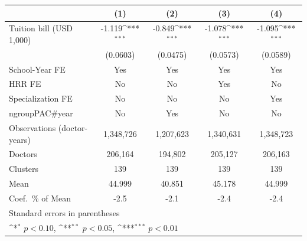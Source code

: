 {
\def\sym#1{\ifmmode^{#1}\else\(^{#1}\)\fi}
\begin{tabular}{l*{4}{c}}
\hline\hline
                    &\multicolumn{1}{c}{(1)}         &\multicolumn{1}{c}{(2)}         &\multicolumn{1}{c}{(3)}         &\multicolumn{1}{c}{(4)}         \\
\hline
Tuition bill (USD 1,000)&      -1.119\sym{***}&      -0.849\sym{***}&      -1.078\sym{***}&      -1.095\sym{***}\\
                    &    (0.0603)         &    (0.0475)         &    (0.0573)         &    (0.0589)         \\
[1em]
School-Year FE      &         Yes         &         Yes         &         Yes         &         Yes         \\
[1em]
HRR FE              &          No         &          No         &         Yes         &          No         \\
[1em]
Specialization FE   &          No         &          No         &          No         &         Yes         \\
[1em]
ngroupPAC#year      &          No         &         Yes         &          No         &          No         \\
\hline
Observations (doctor-years)&   1,348,726         &   1,207,623         &   1,340,631         &   1,348,723         \\
Doctors             &     206,164         &     194,802         &     205,127         &     206,163         \\
Clusters            &         139         &         139         &         139         &         139         \\
Mean                &      44.999         &      40.851         &      45.178         &      44.999         \\
Coef.\ \% of Mean   &        -2.5         &        -2.1         &        -2.4         &        -2.4         \\
\hline\hline
\multicolumn{5}{l}{\footnotesize Standard errors in parentheses}\\
\multicolumn{5}{l}{\footnotesize \sym{*} \(p<0.10\), \sym{**} \(p<0.05\), \sym{***} \(p<0.01\)}\\
\end{tabular}
}
